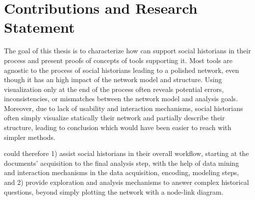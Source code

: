 


\section{Contributions and Research Statement}\label{sec:contribution-and-research-statement}

The goal of this thesis is to characterize how \va can support social historians in their \hsna process and present proofs of concepts of tools supporting it.
Most \snv tools are agnostic to the process of social historians leading to a polished network, even though it has an high impact of the network model and structure.
Using visualization only at the end of the process often reveals potential errors, inconsistencies, or mismatches between the network model and analysis goals\cite{alkadi2022}.
Moreover, due to lack of usability and interaction mechanisms, social historians often simply visualize statically their network and partially describe their structure, leading to conclusion which would have been easier to reach with simpler methods\cite{eveDeuxTraditionsAnalyse2002}.


\va could therefore 1) assist social historians in their overall workflow, starting at the documents' acquisition to the final analysis step, with the help of data mining and interaction mechanisms in the data acquisition, encoding, modeling steps, and 2) provide exploration and analysis mechanisms to answer complex historical questions, beyond simply plotting the network with a node-link diagram.

